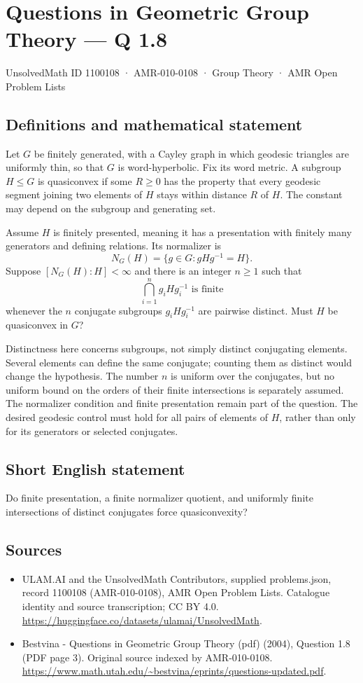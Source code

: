 \documentclass[11pt,a4paper]{article}
\begin{document}
\section*{Questions in Geometric Group Theory — Q 1.8}\label{1100108}
{\small UnsolvedMath ID 1100108 · AMR-010-0108 · Group Theory · AMR Open Problem Lists}
\subsection{Definitions and mathematical statement}
Let $G$ be finitely generated, with a Cayley graph in which geodesic triangles are uniformly thin, so that $G$ is word-hyperbolic. Fix its word metric. A subgroup $H\leq G$ is quasiconvex if some $R\geq0$ has the property that every geodesic segment joining two elements of $H$ stays within distance $R$ of $H$. The constant may depend on the subgroup and generating set.

Assume $H$ is finitely presented, meaning it has a presentation with finitely many generators and defining relations. Its normalizer is
\[
 N_G(H)=\{g\in G:gHg^{-1}=H\}.
\]
Suppose $[N_G(H):H]<\infty$ and there is an integer $n\geq1$ such that
\[
 \bigcap_{i=1}^{n}g_iHg_i^{-1}\text{ is finite}
\]
whenever the $n$ conjugate subgroups $g_iHg_i^{-1}$ are pairwise distinct. Must $H$ be quasiconvex in $G$?

Distinctness here concerns subgroups, not simply distinct conjugating elements. Several elements can define the same conjugate; counting them as distinct would change the hypothesis. The number $n$ is uniform over the conjugates, but no uniform bound on the orders of their finite intersections is separately assumed. The normalizer condition and finite presentation remain part of the question. The desired geodesic control must hold for all pairs of elements of $H$, rather than only for its generators or selected conjugates.
\subsection{Short English statement}
Do finite presentation, a finite normalizer quotient, and uniformly finite intersections of distinct conjugates force quasiconvexity?
\subsection{Sources}
\begin{itemize}
\item[S1] ULAM.AI and the UnsolvedMath Contributors, supplied problems.json, record 1100108 (AMR-010-0108), AMR Open Problem Lists. Catalogue identity and source transcription; CC BY 4.0.
\url{https://huggingface.co/datasets/ulamai/UnsolvedMath}.
\item[S2] Bestvina - Questions in Geometric Group Theory (pdf) (2004), Question 1.8 (PDF page 3). Original source indexed by AMR-010-0108.
\url{https://www.math.utah.edu/~bestvina/eprints/questions-updated.pdf}.
\end{itemize}
\end{document}
